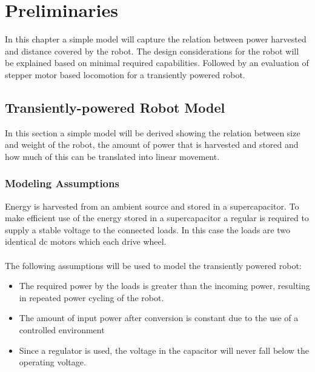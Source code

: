 \chapter{Preliminaries}

In this chapter a simple model will capture the relation between power harvested and distance covered by the robot.
The design considerations for the robot will be explained based on minimal required capabilities. 
Followed by an evaluation of stepper motor based locomotion for a transiently powered robot.

\section{Transiently-powered Robot Model}
\label{sec:transient_model}

In this section a simple model will be derived showing the relation between size and weight of the robot, the amount of power that is harvested and stored and how much of this can be translated into linear movement.

\subsection{Modeling Assumptions}

Energy is harvested from an ambient source and stored in a supercapacitor.
To make efficient use of the energy stored in a supercapacitor a regular is required to supply a stable voltage to the connected loads.
In this case the loads are two identical dc motors which each drive wheel. \\
\\ \noindent
The following assumptions will be used to model the transiently powered robot:
\begin{itemize}
	\item The required power by the loads is greater than the incoming power, resulting in repeated power cycling of the robot.
	\item The amount of input power after conversion is constant due to the use of a controlled environment
	\item Since a regulator is used, the voltage in the capacitor will never fall below the operating voltage.
\end{itemize}




